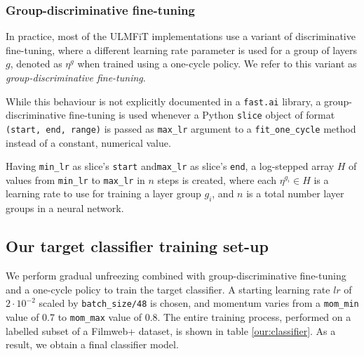 \subsubsection{Group-discriminative fine-tuning}

In practice, most of the ULMFiT implementations use a variant of discriminative fine-tuning, where a different learning rate parameter is used for a group of layers $g$, denoted as $\eta^g$ \cite{howard:practicaldeeplearning1} when trained using a one-cycle policy. We refer to this variant as \emph{group-discriminative fine-tuning}.

While this behaviour is not explicitly documented in a \lstinline{fast.ai} library, a group-discriminative fine-tuning is used whenever a Python \lstinline{slice} object of format \lstinline{(start, end, range)} is passed as \lstinline{max_lr} argument to a \lstinline{fit_one_cycle} method instead of a constant, numerical value. 

Having \lstinline{min_lr} as slice's \lstinline{start} and\lstinline{max_lr} as slice's \lstinline{end}, a log-stepped array $H$ of values from \lstinline{min_lr} to \lstinline{max_lr} in $n$ steps is created, where each $\eta^{g_i} \in H$ is a learning rate to use for training a layer group $g_i$, and $n$ is a total number layer groups in a neural network.

\subsection{Our target classifier training set-up}

We perform gradual unfreezing combined with group-discriminative fine-tuning and a one-cycle policy to train the target classifier. A starting learning rate $lr$ of $2 \cdot 10^{-2}$ scaled by \lstinline{batch_size/48} is chosen, and momentum varies from a \lstinline{mom_min} value of 0.7 to \lstinline{mom_max} value of 0.8. The entire training process, performed on a labelled subset of a Filmweb+ dataset, is shown in table \ref{our:classifier}. As a result, we obtain a final classifier model.

